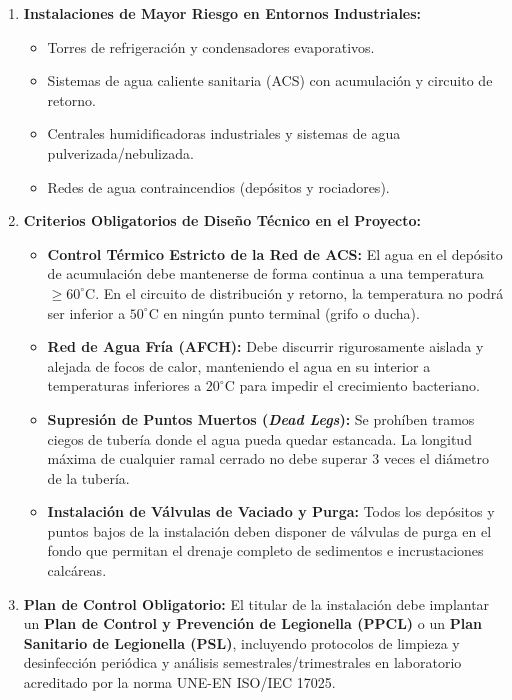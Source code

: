 \documentclass{report}
\begin{document}
\begin{enumerate}
    \item \textbf{Instalaciones de Mayor Riesgo en Entornos Industriales:}
          \begin{itemize}
              \item Torres de refrigeración y condensadores evaporativos.
              \item Sistemas de agua caliente sanitaria (ACS) con acumulación y circuito de retorno.
              \item Centrales humidificadoras industriales y sistemas de agua pulverizada/nebulizada.
              \item Redes de agua contraincendios (depósitos y rociadores).
          \end{itemize}
    \item \textbf{Criterios Obligatorios de Diseño Técnico en el Proyecto:}
          \begin{itemize}
              \item \textbf{Control Térmico Estricto de la Red de ACS:} El agua en el depósito de acumulación debe mantenerse de forma continua a una temperatura $\ge 60^\circ\text{C}$. En el circuito de distribución y retorno, la temperatura no podrá ser inferior a $50^\circ\text{C}$ en ningún punto terminal (grifo o ducha).
              \item \textbf{Red de Agua Fría (AFCH):} Debe discurrir rigurosamente aislada y alejada de focos de calor, manteniendo el agua en su interior a temperaturas inferiores a $20^\circ\text{C}$ para impedir el crecimiento bacteriano.
              \item \textbf{Supresión de Puntos Muertos (\textit{Dead Legs}):} Se prohíben tramos ciegos de tubería donde el agua pueda quedar estancada. La longitud máxima de cualquier ramal cerrado no debe superar $3$ veces el diámetro de la tubería.
              \item \textbf{Instalación de Válvulas de Vaciado y Purga:} Todos los depósitos y puntos bajos de la instalación deben disponer de válvulas de purga en el fondo que permitan el drenaje completo de sedimentos e incrustaciones calcáreas.
          \end{itemize}
    \item \textbf{Plan de Control Obligatorio:}
          El titular de la instalación debe implantar un \textbf{Plan de Control y Prevención de Legionella (PPCL)} o un \textbf{Plan Sanitario de Legionella (PSL)}, incluyendo protocolos de limpieza y desinfección periódica y análisis semestrales/trimestrales en laboratorio acreditado por la norma UNE-EN ISO/IEC 17025.
\end{enumerate}
\end{document}
